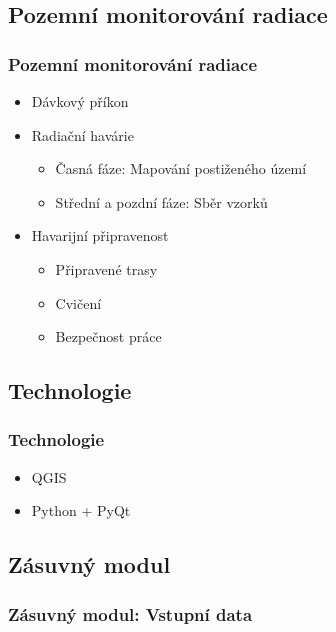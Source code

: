 \documentclass{beamer}
\begin{document}
\begin{frame}
\section{Pozemní monitorování radiace}
\frametitle{Pozemní monitorování radiace}
\begin{itemize}
	\item Dávkový příkon
	\item Radiační havárie
		\begin{itemize}
			\item Časná fáze: Mapování postiženého území
			\item Střední a pozdní fáze: Sběr vzorků
		\end{itemize}
	\item Havarijní připravenost
		\begin{itemize}
			\item Připravené trasy
			\item Cvičení
			\item Bezpečnost práce
		\end{itemize}

\end{itemize}
\end{frame}

\begin{frame}
\section{Technologie}
\frametitle{Technologie}
\begin{itemize}
	\item QGIS
	\item Python + PyQt
\end{itemize}
\end{frame}

\begin{frame}
\section{Zásuvný modul}
\frametitle{Zásuvný modul: Vstupní data}


	 
\end{frame}
\end{document}
